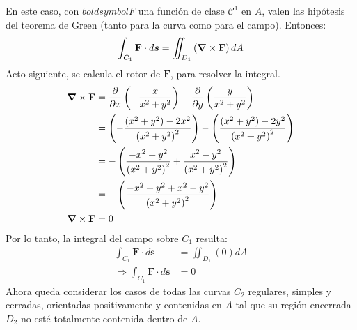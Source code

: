 \begin{solution}
\begin{center}
\begin{tikzpicture}
        \end{tikzpicture}
    \end{center}
    En este caso, con $boldsymbol{F}$ una función de clase
    $\mathcal{C}^1$ en $A$, valen las hipótesis del teorema de Green (tanto para la curva como para el campo). Entonces:
    \begin{equation*}
        \int_{C_1}\mathbf{F}\cdot d\boldsymbol{s} = \iint_{D_1}\left(\grad \times \mathbf{F}\right)dA
    \end{equation*}
    Acto siguiente, se calcula el rotor de $\mathbf{F}$, para resolver la integral.
    \begin{align*}
        \grad \times \mathbf{F} &= \partialx\left( -\frac{x}{x^2+y^2}\right) - \partialy\left(\frac{y}{x^2+y^2}\right)\\
        &= \left(-\frac{(x^2+y^2)-2x^2}{\left(x^2+y^2\right)^2}\right) - \left(\frac{(x^2+y^2)-2y^2}{\left(x^2+y^2\right)^2}\right)\\
        &= -\left(\frac{-x^2+y^2}{\left(x^2+y^2\right)^2}+\frac{x^2-y^2}{\left(x^2+y^2\right)^2}\right)\\
        &= -\left(\frac{-x^2+y^2+x^2-y^2}{\left(x^2+y^2\right)^2}\right)\\
        \grad \times \mathbf{F}&= 0
    \end{align*}
    Por lo tanto, la integral del campo sobre $C_1$ resulta:
    \begin{align*}
        \int_{C_1}\mathbf{F}\cdot d\boldsymbol{s} &= \iint_{D_1}\left(0\right)dA\\
        \Rightarrow \int_{C_1}\mathbf{F}\cdot d\boldsymbol{s} &= 0
    \end{align*}
    Ahora queda considerar los casos de todas las curvas $C_2$ regulares, simples y cerradas, orientadas positivamente
    y contenidas en $A$ tal que su región encerrada $D_2$ no esté totalmente contenida dentro de $A$.
    \begin{center}
\end{center}
\end{solution}
